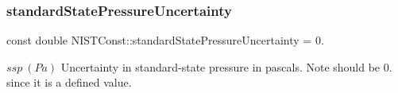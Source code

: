 \subsubsection{\texorpdfstring{standard\+State\+Pressure\+Uncertainty}{standardStatePressureUncertainty}}
{\footnotesize\ttfamily const double N\+I\+S\+T\+Const\+::standard\+State\+Pressure\+Uncertainty = 0.}

$ssp \ (Pa)$ Uncertainty in standard-\/state pressure in pascals. Note should be 0. since it is a defined value. 